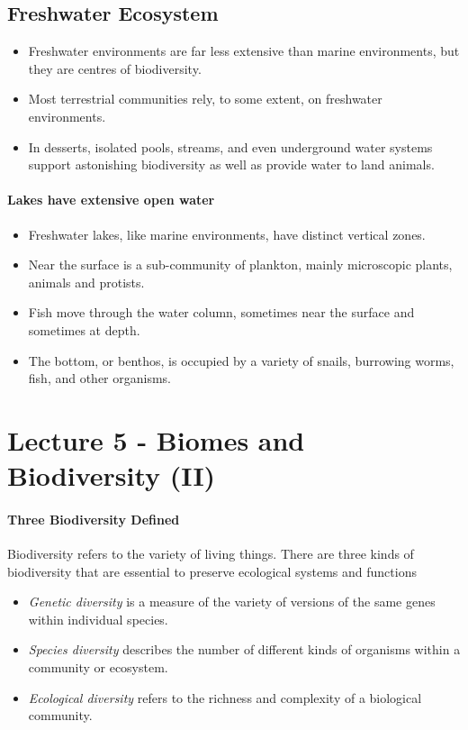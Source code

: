 \documentclass[10pt]{article}
\begin{document}
\subsection{Freshwater Ecosystem}
\begin{itemize}
    \item Freshwater environments are far less extensive than marine environments, but they are centres of biodiversity. 
    \item Most terrestrial communities rely, to some extent, on freshwater environments. 
    \item In desserts, isolated pools, streams, and even underground water systems support astonishing biodiversity as well as provide water to land animals. 
\end{itemize}

\paragraph{Lakes have extensive open water}
\begin{itemize}
    \item Freshwater lakes, like marine environments, have distinct vertical zones. 
    \item Near the surface is a sub-community of plankton, mainly microscopic plants, animals and protists. 
    \item Fish move through the water column, sometimes near the surface and sometimes at depth. 
    \item The bottom, or benthos, is occupied by a variety of snails, burrowing worms, fish, and other organisms. 
\end{itemize}



\section{Lecture 5 - Biomes and Biodiversity (II)}
\paragraph{Three Biodiversity Defined}
Biodiversity refers to the variety of living things. There are three kinds of biodiversity that are essential to preserve ecological systems and functions
\begin{itemize}
    \item \textit{Genetic diversity} is a measure of the variety of versions of the same genes within individual species. 
    \item \textit{Species diversity} describes the number of different kinds of organisms within a community or ecosystem. 
    \item \textit{Ecological diversity} refers to the richness and complexity of a biological community. 
\end{itemize}
\end{document}
